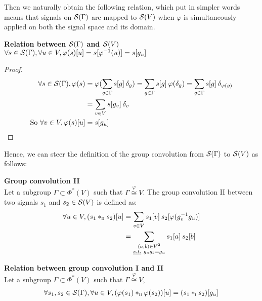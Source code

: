 Then we naturally obtain the following relation, which put in simpler words means that signals on $\cs(\Gamma)$ are mapped to $\cs(V)$ when $\varphi$ is simultaneously applied on both the signal space and its domain.

\begin{lemma}\textbf{Relation between $\cs(\Gamma)$ and $\cs(V)$}\\
$\forall s \in \cs(\Gamma), \forall u \in V, \varphi(s)[u] = s[\varphi^{-1}(u)] = s[g_u]$
\label{lem:outer}
\end{lemma}

\begin{proof}
\begin{align*}
\forall s \in \cs(\Gamma), \varphi(s) & = \varphi(\displaystyle \sum_{g \in \Gamma} s[g] \h{2} \delta_g)
 = \displaystyle \sum_{g \in \Gamma} s[g] \h{2} \varphi(\delta_g)
 = \displaystyle \sum_{g \in \Gamma} s[g] \h{2} \delta_{\varphi(g)}\\
 & = \displaystyle \sum_{v \in V} s[g_v] \h{2} \delta_v\\
 \text{So }\forall v \in V, \varphi(s) [u] & = s[g_u]
\end{align*}
\end{proof}

Hence, we can steer the definition of the group convolution from $\cs(\Gamma)$ to $\cs(V)$ as follows:

\begin{definition}\textbf{Group convolution II}\\
Let a subgroup $\Gamma \subset \Phi^*(V)$ such that $\Gamma \overset{\varphi}{\cong} V$.
The group convolution II between two signals $s_1$ and $s_2 \in \cs(V)$ is defined as:
\begin{align*}
\forall u \in V, (s_1 \ast_{\II} s_2) [u] & = \displaystyle \sum_{v \in V} s_1[v] \h{2} s_2[\varphi(g_v^{-1}g_u)]\\
& = \displaystyle \sum_{\substack{(a,b) \in V^2 \\ \st g_ag_b=g_u }} s_1[a] \h{2} s_2[b]
\end{align*}
\label{def:conv2}
\end{definition}

\begin{lemma}\textbf{Relation between group convolution I and II}\\
Let a subgroup $\Gamma \subset \Phi^*(V)$ such that $\Gamma \overset{\varphi}{\cong} V$,
\begin{gather*}
\forall s_1, s_2 \in \cs(\Gamma), \forall u \in V,
(\varphi(s_1) \ast_{\II} \varphi(s_2))[u] = (s_1 \ast_{\I} s_2)[g_u]
\end{gather*}
\label{lem:rel12}
\end{lemma}

